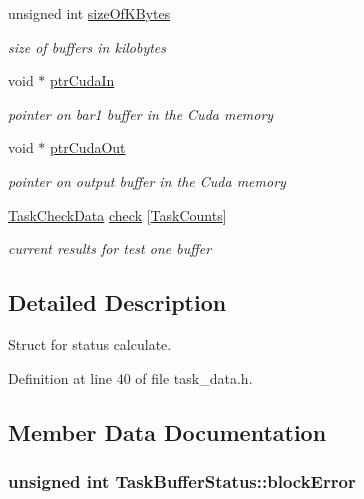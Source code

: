 \begin{DoxyCompactItemize}
unsigned int \hyperlink{structTaskBufferStatus_ac09e520b4c35bddd83c61ab0a0d20e94}{sizeOfKBytes}
\begin{DoxyCompactList}\small\item\em size of buffers in kilobytes \item\end{DoxyCompactList}\item 
void $\ast$ \hyperlink{structTaskBufferStatus_a530d1c73d828ba73216ab03fa67be5d4}{ptrCudaIn}
\begin{DoxyCompactList}\small\item\em pointer on bar1 buffer in the Cuda memory \item\end{DoxyCompactList}\item 
void $\ast$ \hyperlink{structTaskBufferStatus_ac3996bd365a6296309bd372b227bbbdc}{ptrCudaOut}
\begin{DoxyCompactList}\small\item\em pointer on output buffer in the Cuda memory \item\end{DoxyCompactList}\item 
\hyperlink{structTaskCheckData}{TaskCheckData} \hyperlink{structTaskBufferStatus_ab95fe846215632d00858e3ed0fa4a293}{check} \mbox{[}\hyperlink{task__data_8h_a3c397e824761613a5e1d71e1b6d49b6d}{TaskCounts}\mbox{]}
\begin{DoxyCompactList}\small\item\em current results for test one buffer \item\end{DoxyCompactList}\end{DoxyCompactItemize}


\subsection{Detailed Description}
Struct for status calculate. 

Definition at line 40 of file task\_\-data.h.

\subsection{Member Data Documentation}
\hypertarget{structTaskBufferStatus_a81844ea492b32a7e9d29dda117a3f935}{
\subsubsection[{blockError}]{\setlength{\rightskip}{0pt plus 5cm}unsigned int {\bf TaskBufferStatus::blockError}}}
\label{structTaskBufferStatus_a81844ea492b32a7e9d29dda117a3f935}


